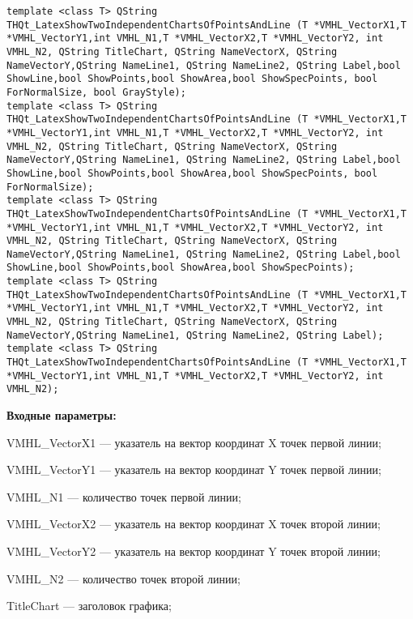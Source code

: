 \documentclass[a4paper,12pt]{article}
\begin{document}
\begin{lstlisting}[label=code_syntax_THQt_LatexShowTwoIndependentChartsOfPointsAndLine,caption=Синтаксис]
template <class T> QString THQt_LatexShowTwoIndependentChartsOfPointsAndLine (T *VMHL_VectorX1,T *VMHL_VectorY1,int VMHL_N1,T *VMHL_VectorX2,T *VMHL_VectorY2, int VMHL_N2, QString TitleChart, QString NameVectorX, QString NameVectorY,QString NameLine1, QString NameLine2, QString Label,bool ShowLine,bool ShowPoints,bool ShowArea,bool ShowSpecPoints, bool ForNormalSize, bool GrayStyle);
template <class T> QString THQt_LatexShowTwoIndependentChartsOfPointsAndLine (T *VMHL_VectorX1,T *VMHL_VectorY1,int VMHL_N1,T *VMHL_VectorX2,T *VMHL_VectorY2, int VMHL_N2, QString TitleChart, QString NameVectorX, QString NameVectorY,QString NameLine1, QString NameLine2, QString Label,bool ShowLine,bool ShowPoints,bool ShowArea,bool ShowSpecPoints, bool ForNormalSize);
template <class T> QString THQt_LatexShowTwoIndependentChartsOfPointsAndLine (T *VMHL_VectorX1,T *VMHL_VectorY1,int VMHL_N1,T *VMHL_VectorX2,T *VMHL_VectorY2, int VMHL_N2, QString TitleChart, QString NameVectorX, QString NameVectorY,QString NameLine1, QString NameLine2, QString Label,bool ShowLine,bool ShowPoints,bool ShowArea,bool ShowSpecPoints);
template <class T> QString THQt_LatexShowTwoIndependentChartsOfPointsAndLine (T *VMHL_VectorX1,T *VMHL_VectorY1,int VMHL_N1,T *VMHL_VectorX2,T *VMHL_VectorY2, int VMHL_N2, QString TitleChart, QString NameVectorX, QString NameVectorY,QString NameLine1, QString NameLine2, QString Label);
template <class T> QString THQt_LatexShowTwoIndependentChartsOfPointsAndLine (T *VMHL_VectorX1,T *VMHL_VectorY1,int VMHL_N1,T *VMHL_VectorX2,T *VMHL_VectorY2, int VMHL_N2);
\end{lstlisting}

\textbf{Входные параметры:}
 
    VMHL\_VectorX1 --- указатель на вектор координат X точек первой линии;
 
    VMHL\_VectorY1 --- указатель на вектор координат Y точек первой линии;
 
    VMHL\_N1 --- количество точек первой линии;
 
    VMHL\_VectorX2 --- указатель на вектор координат X точек второй линии;
 
    VMHL\_VectorY2 --- указатель на вектор координат Y точек второй линии;
 
    VMHL\_N2 --- количество точек второй линии;
 
    TitleChart --- заголовок графика;
 
\end{document}
